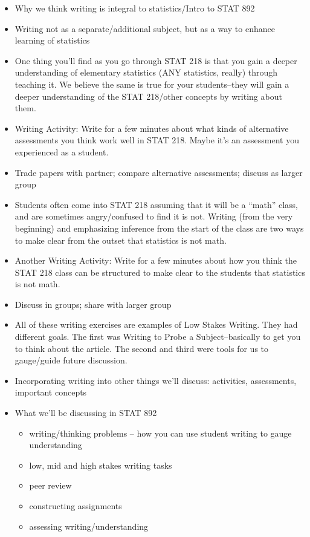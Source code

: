\documentclass{article}
\begin{document}
\begin{itemize}
\begin{itemize}
\begin{itemize}
\item Why we think writing is integral to statistics/Intro to STAT 892
\item Writing not as a separate/additional subject, but as a way to enhance learning of statistics
\item One thing you'll find as you go through STAT 218 is that you gain a deeper understanding of elementary statistics (ANY statistics, really) through teaching it.  We believe the same is true for your students--they will gain a deeper understanding of the STAT 218/other concepts by writing about them.
\item Writing Activity:  Write for a few minutes about what kinds of alternative assessments you think work well in STAT 218. Maybe it's an assessment you experienced as a student. 
\item Trade papers with partner; compare alternative assessments; discuss as larger group
\item Students often come into STAT 218 assuming that it will be a ``math'' class, and are sometimes angry/confused to find it is not.  Writing (from the very beginning) and emphasizing inference from the start of the class are two ways to make clear from the outset that statistics is not math.
\item Another Writing Activity:  Write for a few minutes about how you think the STAT 218 class can be structured to make clear to the students that statistics is not math.
\item Discuss in groups; share with larger group
\item All of these writing exercises are examples of Low Stakes Writing. They had different goals.  The first was Writing to Probe a Subject--basically to get you to think about the article.  The second and third were tools for us to gauge/guide future discussion.  
\item Incorporating writing into other things we'll discuss: activities, assessments, important concepts
\item What we'll be discussing in STAT 892
\begin{itemize}
\item  writing/thinking problems -- how you can use student writing to gauge understanding
\item low, mid and high stakes writing tasks
\item peer review 
\item constructing assignments
\item assessing writing/understanding
\end{itemize}
\end{itemize}


\end{itemize}
\end{itemize}
\end{document}
